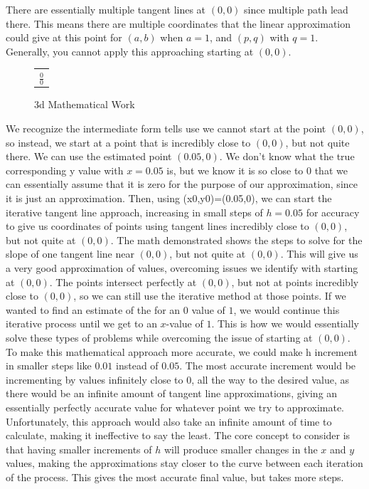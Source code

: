 \documentclass[answers,addpoints]{exam}
\begin{document}
\begin{questions}
\begin{solution}
    There are essentially multiple tangent lines at $(0,0)$ since multiple path lead there. This means there are multiple coordinates that the linear approximation could give at this point for $(a,b)$ when $a=1$, and $(p,q)$ with $q=1$. Generally, you cannot apply this approaching starting at $(0,0)$.

    \begin{figure}[H]
      \centering
      \begin{tabular}{@{}l@{}}
        $\displaystyle \frac{0}{0}$ \\[6pt]
      \end{tabular}
      \caption{3d Mathematical Work}
      \label{fig:3d-math}
    \end{figure}

    We recognize the intermediate form tells use we cannot start at the point $(0,0)$, so instead, we start at a point that is incredibly close to $(0,0)$, but not quite there. We can use the estimated point $(0.05,0)$. We don't know what the true corresponding y value with $x=0.05$ is, but we know it is so close to $0$ that we can essentially assume that it is zero for the purpose of our approximation, since it is just an approximation. Then, using (x0,y0)=(0.05,0), we can start the iterative tangent line approach, increasing in small steps of $h=0.05$ for accuracy to give us coordinates of points using tangent lines incredibly close to $(0,0)$, but not quite at $(0,0)$. The math demonstrated shows the steps to solve for the slope of one tangent line near $(0,0)$, but not quite at $(0,0)$. This will give us a very good approximation of values, overcoming issues we identify with starting at $(0,0)$. The points intersect perfectly at $(0,0)$, but not at points incredibly close to $(0,0)$, so we can still use the iterative method at those points. If we wanted to find an estimate of the for an $0$ value of $1$, we would continue this iterative process until we get to an $x$-value of $1$. This is how we would essentially solve these types of problems while overcoming the issue of starting at $(0,0)$. To make this mathematical approach more accurate, we could make h increment in smaller steps like $0.01$ instead of $0.05$. The most accurate increment would be incrementing by values infinitely close to $0$, all the way to the desired value, as there would be an infinite amount of tangent line approximations, giving an essentially perfectly accurate value for whatever point we try to approximate. Unfortunately, this approach would also take an infinite amount of time to calculate, making it ineffective to say the least. The core concept to consider is that having smaller increments of $h$ will produce smaller changes in the $x$ and $y$ values, making the approximations stay closer to the curve between each iteration of the process. This gives the most accurate final value, but takes more steps.


\end{solution}
\end{questions}
\end{document}
